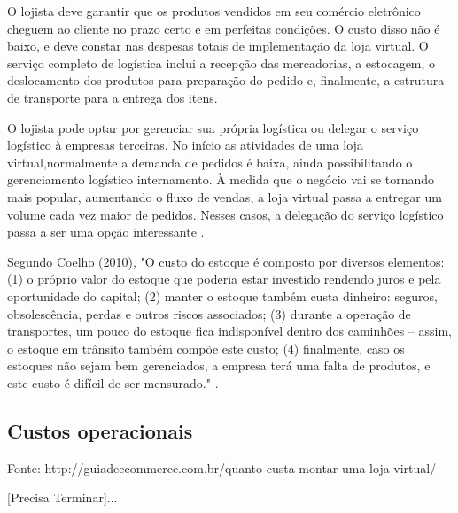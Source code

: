 O lojista deve garantir que os produtos vendidos em seu comércio eletrônico cheguem ao cliente no prazo certo e em perfeitas condições. O custo disso não é baixo, e deve constar nas despesas totais de implementação da loja virtual. O serviço completo de logística inclui a recepção das mercadorias, a estocagem, o deslocamento dos produtos para preparação do pedido e, finalmente, a estrutura de transporte para a entrega dos itens.

O lojista pode optar por gerenciar sua própria logística ou delegar o serviço logístico à empresas terceiras. No início as atividades de uma loja virtual,normalmente a demanda de pedidos é baixa, ainda possibilitando o gerenciamento logístico internamento.  À medida que o negócio vai se tornando mais popular, aumentando o fluxo de vendas, a loja virtual passa a entregar um volume cada vez maior de pedidos. Nesses casos, a delegação do serviço logístico passa a ser uma opção interessante \cite{Guiadeecommerce2015}.

Segundo Coelho (2010), "O custo do estoque é composto por diversos elementos: (1) o próprio valor do estoque que poderia estar investido rendendo juros e pela oportunidade do capital; (2) manter o estoque também custa dinheiro: seguros, obsolescência, perdas e outros riscos associados; (3) durante a operação de transportes, um pouco do estoque fica indisponível dentro dos caminhões – assim, o estoque em trânsito também compõe este custo; (4) finalmente, caso os estoques não sejam bem gerenciados, a empresa terá uma falta de produtos, e este custo é difícil de ser mensurado." \nocite{Coelho2010}.


\subsection{Custos operacionais}

Fonte: http://guiadeecommerce.com.br/quanto-custa-montar-uma-loja-virtual/
\cite{Guiadeecommerce2014}

[Precisa Terminar]...

